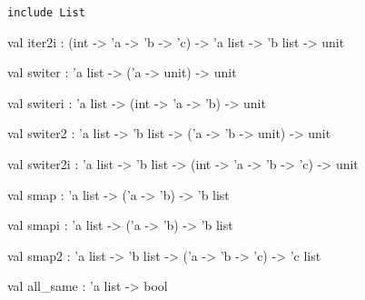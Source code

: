 \documentclass[11pt]{article}
\begin{document}
\begin{ocamldocsigend}


{\tt{include }}{\tt{List}}

\label{val:Util.L.iter2i}\begin{ocamldoccode}
val iter2i : (int -> 'a -> 'b -> 'c) -> 'a list -> 'b list -> unit
\end{ocamldoccode}


\label{val:Util.L.switer}\begin{ocamldoccode}
val switer : 'a list -> ('a -> unit) -> unit
\end{ocamldoccode}


\label{val:Util.L.switeri}\begin{ocamldoccode}
val switeri : 'a list -> (int -> 'a -> 'b) -> unit
\end{ocamldoccode}


\label{val:Util.L.switer2}\begin{ocamldoccode}
val switer2 : 'a list -> 'b list -> ('a -> 'b -> unit) -> unit
\end{ocamldoccode}


\label{val:Util.L.switer2i}\begin{ocamldoccode}
val switer2i : 'a list -> 'b list -> (int -> 'a -> 'b -> 'c) -> unit
\end{ocamldoccode}


\label{val:Util.L.smap}\begin{ocamldoccode}
val smap : 'a list -> ('a -> 'b) -> 'b list
\end{ocamldoccode}


\label{val:Util.L.smapi}\begin{ocamldoccode}
val smapi : 'a list -> ('a -> 'b) -> 'b list
\end{ocamldoccode}


\label{val:Util.L.smap2}\begin{ocamldoccode}
val smap2 : 'a list -> 'b list -> ('a -> 'b -> 'c) -> 'c list
\end{ocamldoccode}


\label{val:Util.L.all-underscoresame}\begin{ocamldoccode}
val all_same : 'a list -> bool
\end{ocamldoccode}



\end{ocamldocsigend}
\end{document}
